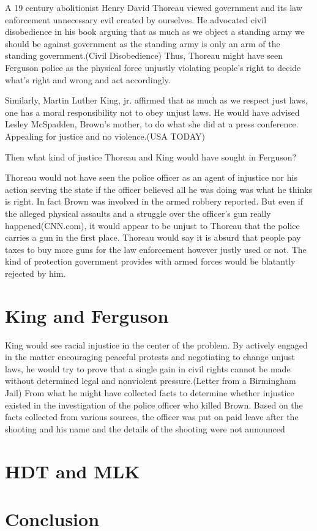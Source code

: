 \documentclass{article}
\begin{document}
A 19 century abolitionist Henry David Thoreau viewed government and its law
enforcement unnecessary evil created by ourselves. He advocated civil
disobedience in his book arguing that as much as we object a standing army we
should be against government as the standing army is only an arm of the standing
government.(Civil Disobedience) Thus, Thoreau might have seen Ferguson police as
the physical force unjustly violating people's right to decide what's right and
wrong and act accordingly.  

Similarly, Martin Luther King, jr. affirmed that as much as we respect just
laws, one has a moral responsibility not to obey unjust laws. He would have
advised Lesley McSpadden, Brown's mother, to do what she did at a press
conference. Appealing for justice and no violence.(USA TODAY) 

Then what kind of justice Thoreau and King would have sought in Ferguson?

Thoreau would not have seen the police officer as an agent of injustice nor his
action serving the state if the officer believed all he was doing was what he
thinks is right. In fact Brown was involved in the armed robbery reported. But
even if the alleged physical assaults and a struggle over the officer's gun
really happened(CNN.com), it would appear to be unjust to Thoreau that the
police carries a gun in the first place. Thoreau would say it is absurd that
people pay taxes to buy more guns for the law enforcement however justly used or
not. The kind of protection government provides with armed forces would be
blatantly rejected by him.     

\section{King and Ferguson}

King would see racial injustice in the center of the problem. By actively
engaged in the matter encouraging peaceful protests and negotiating to change
unjust laws, he would try to prove that a single gain in civil rights cannot be
made without determined legal and nonviolent pressure.(Letter from a Birmingham
Jail) From what he might have collected facts to determine whether injustice
existed in the investigation of the police officer who killed Brown. Based on
the facts collected from various sources, the officer was put on paid leave
after the shooting and his name and the details of the shooting were not
announced 

\section{HDT and MLK}

\section{Conclusion}
\end{document}
